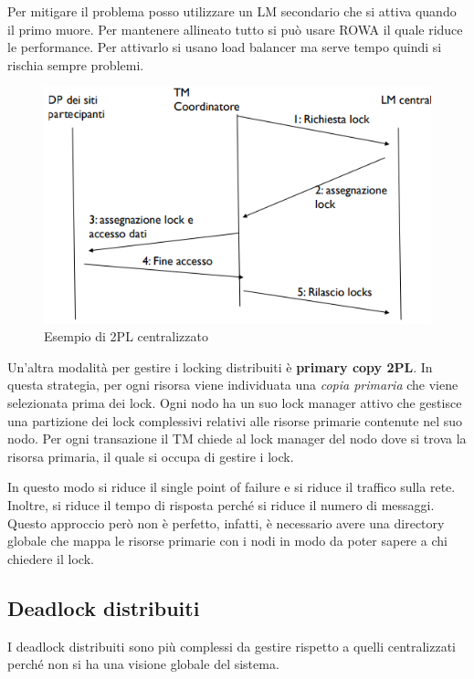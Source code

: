 Per mitigare il problema posso utilizzare un LM secondario che si attiva quando
il primo muore. Per mantenere allineato tutto si può usare ROWA il quale riduce
le performance. Per attivarlo si usano load balancer ma serve tempo quindi si
rischia sempre problemi.
\begin{figure}[!ht]
      \centering
      \includegraphics[width=.5\textwidth]{img/DDBMS/centralized_2PL.png}
      \caption{Esempio di 2PL centralizzato}
      \label{fig:2PL_centralizzato}
\end{figure}

Un'altra modalità per gestire i locking distribuiti è \textbf{primary copy 2PL}.
In questa strategia, per ogni risorsa viene individuata una \textit{copia primaria}
che viene selezionata prima dei lock. Ogni nodo ha un suo lock manager attivo che
gestisce una partizione dei lock complessivi relativi alle risorse primarie
contenute nel suo nodo. Per ogni transazione il TM chiede al lock manager del nodo
dove si trova la risorsa primaria, il quale si occupa di gestire i lock.

In questo modo si riduce il single point of failure e si riduce il traffico
sulla rete. Inoltre, si riduce il tempo di risposta perché si riduce il numero
di messaggi. Questo approccio però non è perfetto, infatti, è necessario avere
una directory globale che mappa le risorse primarie con i nodi in modo da poter
sapere a chi chiedere il lock.
\subsection{Deadlock distribuiti}
I deadlock distribuiti sono più complessi da gestire rispetto a quelli centralizzati
perché non si ha una visione globale del sistema.

